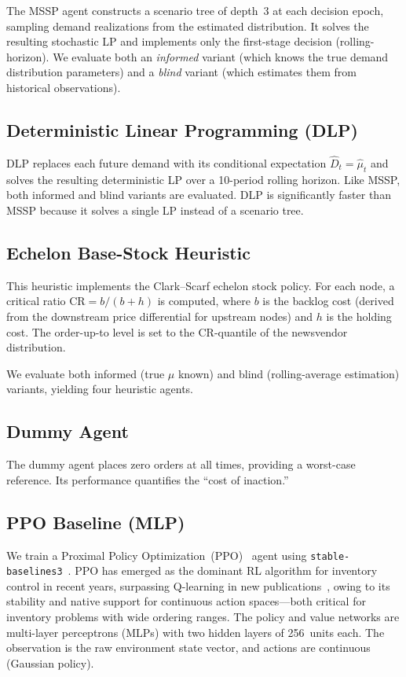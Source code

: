 \documentclass[preprint,12pt]{elsarticle}
\begin{document}
The MSSP agent constructs a scenario tree of depth~3 at each decision
epoch, sampling demand realizations from the estimated distribution.
It solves the resulting stochastic LP and implements only the first-stage
decision (rolling-horizon). We evaluate both an \emph{informed} variant
(which knows the true demand distribution parameters) and a \emph{blind}
variant (which estimates them from historical observations).

\subsection{Deterministic Linear Programming (DLP)}

DLP replaces each future demand with its conditional expectation
$\hat{D}_t = \hat{\mu}_t$ and solves the resulting deterministic LP over
a 10-period rolling horizon. Like MSSP, both informed and blind variants
are evaluated. DLP is significantly faster than MSSP because it solves a
single LP instead of a scenario tree.

\subsection{Echelon Base-Stock Heuristic}

This heuristic implements the Clark--Scarf echelon stock policy. For each
node, a critical ratio $\text{CR} = b / (b + h)$ is computed, where $b$ is
the backlog cost (derived from the downstream price differential for
upstream nodes) and $h$ is the holding cost. The order-up-to level is set
to the $\text{CR}$-quantile of the newsvendor distribution.

We evaluate both informed (true $\mu$ known) and blind
(rolling-average estimation) variants, yielding four heuristic agents.

\subsection{Dummy Agent}

The dummy agent places zero orders at all times, providing a
worst-case reference. Its performance quantifies the ``cost of inaction.''

\subsection{PPO Baseline (MLP)}

We train a Proximal Policy Optimization~(PPO)~\citep{schulman2017proximal}
agent using \texttt{stable-baselines3}~\citep{raffin2021stable}.
PPO has emerged as the dominant RL algorithm for inventory control
in recent years, surpassing Q-learning in new
publications~\citep{bergsma2025systematic}, owing to its stability
and native support for continuous action spaces---both critical
for inventory problems with wide ordering ranges. The
policy and value networks are multi-layer perceptrons (MLPs) with two
hidden layers of 256~units each. The observation is the raw environment
state vector, and actions are continuous (Gaussian policy).
\end{document}
